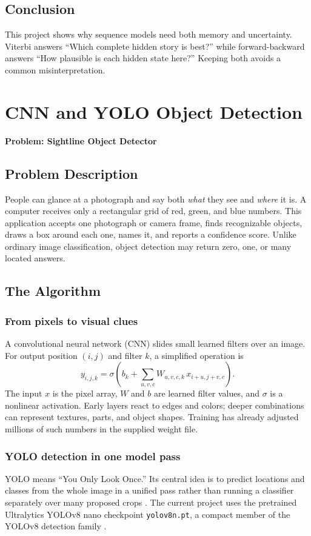 \documentclass[12pt,a4paper,openany]{report}
\newcommand{\problemname}[1]{%
  \begin{center}
    {\Large\color{blue}\textbf{Problem: #1}}
  \end{center}
  \vspace{0.5em}
}
\begin{document}
\section{Conclusion}
This project shows why sequence models need both memory and uncertainty. Viterbi
answers ``Which complete hidden story is best?'' while forward-backward answers
``How plausible is each hidden state here?'' Keeping both avoids a common
misinterpretation.

\else
\chapter{CNN and YOLO Object Detection}
\problemname{Sightline Object Detector}

\section{Problem Description}
People can glance at a photograph and say both \emph{what} they see and
\emph{where} it is. A computer receives only a rectangular grid of red, green,
and blue numbers. This application accepts one photograph or camera frame,
finds recognizable objects, draws a box around each one, names it, and reports
a confidence score. Unlike ordinary image classification, object detection may
return zero, one, or many located answers.

\section{The Algorithm}
\subsection{From pixels to visual clues}
A convolutional neural network (CNN) slides small learned filters over an image.
For output position $(i,j)$ and filter $k$, a simplified operation is
\begin{equation}
 y_{i,j,k}=\sigma\!\left(b_k+
 \sum_{u,v,c} W_{u,v,c,k}\,x_{i+u,j+v,c}\right).
\end{equation}
The input $x$ is the pixel array, $W$ and $b$ are learned filter values, and
$\sigma$ is a nonlinear activation. Early layers react to edges and colors;
deeper combinations can represent textures, parts, and object shapes. Training
has already adjusted millions of such numbers in the supplied weight file.

\subsection{YOLO detection in one model pass}
YOLO means ``You Only Look Once.'' Its central idea is to predict locations and
classes from the whole image in a unified pass rather than running a classifier
separately over many proposed crops \cite{redmon}. The current project uses the
pretrained Ultralytics YOLOv8 nano checkpoint \texttt{yolov8n.pt}, a compact
member of the YOLOv8 detection family \cite{ultralyticsV8}.
\end{document}
